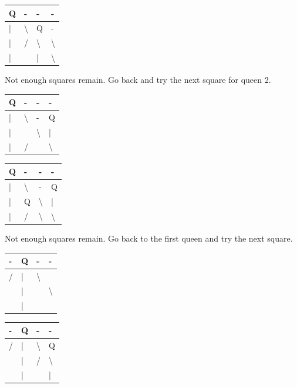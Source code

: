 \documentclass{article}
\begin{document}
\begin{enumerate}
\begin{table}[H]
\begin{tabular}{|l|l|l|l|}
\hline
Q & - & - & - \\ \hline
| & \textbackslash{} & Q & - \\ \hline
| & / & \textbackslash{} & \textbackslash{} \\ \hline
| &  & | & \textbackslash{} \\ \hline
\end{tabular}
\end{table}


Not enough squares remain. Go back and try the next square for queen 2. 

\begin{table}[H]
\begin{tabular}{|l|l|l|l|}
\hline
Q & - & - & - \\ \hline
| & \textbackslash{} & - & Q \\ \hline
| &  & \textbackslash{} & | \\ \hline
| & / &  & \textbackslash{} \\ \hline
\end{tabular}
\end{table}


\begin{table}[H]
\begin{tabular}{|l|l|l|l|}
\hline
Q & - & - & - \\ \hline
| & \textbackslash{} & - & Q \\ \hline
| & Q & \textbackslash{} & | \\ \hline
| & / & \textbackslash{} & \textbackslash{} \\ \hline
\end{tabular}
\end{table}

Not enough squares remain. Go back to the first queen and try the next square. 

\begin{table}[H]
\begin{tabular}{|l|l|l|l|}
\hline
- & Q & - & - \\ \hline
/ & | & \textbackslash{} &  \\ \hline
 & | &  & \textbackslash{} \\ \hline
 & | &  &  \\ \hline
\end{tabular}
\end{table}


\begin{table}[H]
\begin{tabular}{|l|l|l|l|}
\hline
- & Q & - & - \\ \hline
/ & | & \textbackslash{} & Q \\ \hline
 & | & / & \textbackslash{} \\ \hline
 & | &  & | \\ \hline
\end{tabular}
\end{table}



\end{enumerate}
\end{document}
